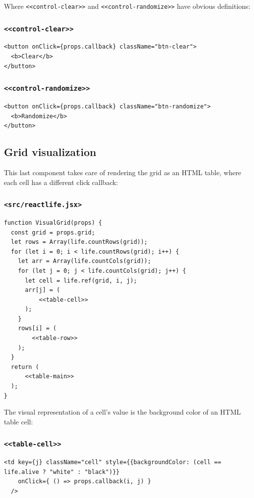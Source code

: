 \documentclass[11pt]{article}
\begin{document}
Where \texttt{<<control-clear>>} and \texttt{<<control-randomize>>} have obvious definitions:

\subsubsection{\texttt{<<control-clear>>}}
\label{sec:org51e40e8}
\begin{verbatim}
<button onClick={props.callback} className="btn-clear">
  <b>Clear</b>
</button>
\end{verbatim}

\subsubsection{\texttt{<<control-randomize>>}}
\label{sec:org940dd9e}
\begin{verbatim}
<button onClick={props.callback} className="btn-randomize">
  <b>Randomize</b>
</button>
\end{verbatim}

\subsection{Grid visualization}
\label{sec:org6504856}

This last component takes care of rendering the grid as an HTML table, where each cell has a different click callback:

\subsubsection{\texttt{<src/reactlife.jsx>}}
\label{sec:orgd334b84}
\begin{verbatim}
function VisualGrid(props) {
  const grid = props.grid;
  let rows = Array(life.countRows(grid));
  for (let i = 0; i < life.countRows(grid); i++) {
    let arr = Array(life.countCols(grid));
    for (let j = 0; j < life.countCols(grid); j++) {
      let cell = life.ref(grid, i, j);
      arr[j] = (
          <<table-cell>>
      );
    }
    rows[i] = (
        <<table-row>>
    );
  }
  return (
      <<table-main>>
  );
}
\end{verbatim}

The visual representation of a cell's value is the background color of an HTML table cell:

\subsubsection{\texttt{<<table-cell>>}}
\label{sec:orgfbd8623}
\begin{verbatim}
<td key={j} className="cell" style={{backgroundColor: (cell == life.alive ? "white" : "black")}}
    onClick={ () => props.callback(i, j) }
  />
\end{verbatim}
\end{document}
